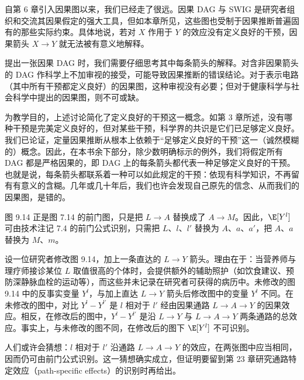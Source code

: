 自第 6 章引入因果图以来，我们已经走了很远。因果 DAG 与 SWIG 是研究者组织和交流其因果假定的强大工具，但如本章所见，这些图也受制于因果推断普遍固有的那些实际约束。具体地说，若对 $X$ 作用于 $Y$ 的效应没有定义良好的干预，因果箭头 $X\rightarrow Y$ 就无法被有意义地解释。

提出一张因果 DAG 时，我们需要仔细思考其中每条箭头的解释。对含非因果箭头的 DAG 作科学上不加审视的接受，可能导致因果推断的错误结论。对于表示电路（其中所有干预都定义良好）的因果图，这种审视没有必要；但对于健康科学与社会科学中提出的因果图，则不可或缺。

为教学目的，上述讨论简化了定义良好的干预这一概念。如第 3 章所述，没有哪种干预是完美定义良好的，但对某些干预，科学界的共识是它们已足够定义良好。我们已论证，定量因果推断从根本上依赖于“足够定义良好的干预”这一（诚然模糊的）概念。因此，在本书余下部分，除少数明确标示的例外，我们将假定所有 DAG 都是严格因果的，即 DAG 上的每条箭头都代表一种足够定义良好的干预。也就是说，每条箭头都联系着一种可以如此规定的干预：依现有科学知识，不再留有有意义的含糊。几年或几十年后，我们也许会发现自己原先的信念、从而我们的因果图，是错的。

\begin{finepoint}[与前门公式的联系]
图 9.14 正是图 7.14 的前门图，只是把 $L\rightarrow A$ 替换成了 $A\rightarrow M$。因此，$\E[Y^{l}]$ 可由技术注记 7.4 的前门公式识别，只需把 $L$、$l$、$l'$ 替换为 $A$、$a$、$a'$，把 $A$、$a$ 替换为 $M$、$m$。

设一位研究者修改图 9.14，加上一条直达的 $L\rightarrow Y$ 箭头。理由在于：当营养师与理疗师接诊某位 $L$ 取值很高的个体时，会提供额外的辅助照护（如饮食建议、预防深静脉血栓的运动等），而这些并未记录在研究者可获得的病历中。未修改的图 9.14 中的反事实变量 $Y^{l}$，与加上直达 $L\rightarrow Y$ 箭头后修改图中的变量 $Y^{l}$ 不同。在未修改的图中，对比 $Y^{l}-Y^{l'}$ 是 $l$ 相对于 $l'$ 经由因果通路 $L\rightarrow A\rightarrow Y$ 的因果效应。相反，在修改后的图中，$Y^{l}-Y^{l'}$ 是沿 $L\rightarrow Y$ 与 $L\rightarrow A\rightarrow Y$ 两条通路的总效应。事实上，与未修改的图不同，在修改后的图下 $\E[Y^{l}]$ 不可识别。

人们或许会猜想：$l$ 相对于 $l'$ 沿通路 $L\rightarrow A\rightarrow Y$ 的效应，在两张图中应当相同，因而仍可由前门公式识别。这一猜想确实成立，但证明要留到第 23 章研究通路特定效应（path-specific effects）的识别时再给出。
\end{finepoint}

